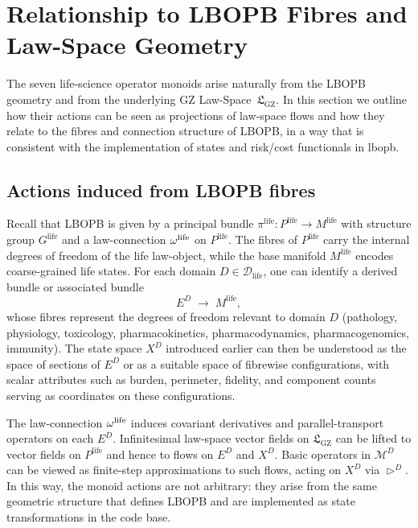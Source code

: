 \documentclass[11pt]{book}
\theoremstyle{plain}
\theoremstyle{definition}
\theoremstyle{remark}
\newcommand{\GZLS}{\ensuremath{\mathfrak{L}_{\mathrm{GZ}}}}       \newcommand{\GZLT}{\ensuremath{M_{!w}}}                           \newcommand{\GZLOC}{\ensuremath{A_M}}                             \newcommand{\GZLCurv}{\ensuremath{\mathcal{F}_{\mathrm{law}}}}
\begin{document}
\section{Relationship to LBOPB Fibres and Law-Space Geometry}


The seven life-science operator monoids arise naturally from the LBOPB
geometry and from the underlying GZ Law-Space~$\GZLS$. In this section
we outline how their actions can be seen as projections of law-space
flows and how they relate to the fibres and connection structure of
LBOPB, in a way that is consistent with the implementation of states
and risk/cost functionals in lbopb.

\subsection*{Actions induced from LBOPB fibres}

Recall that LBOPB is given by a principal bundle
$\pi^{\mathrm{life}} \colon P^{\mathrm{life}} \to M^{\mathrm{life}}$
with structure group $G^{\mathrm{life}}$ and a law-connection
$\omega^{\mathrm{life}}$ on $P^{\mathrm{life}}$. The fibres of
$P^{\mathrm{life}}$ carry the internal degrees of freedom of the life
law-object, while the base manifold $M^{\mathrm{life}}$ encodes
coarse-grained life states. For each domain $D \in \mathcal{D}_{\mathrm{life}}$,
one can identify a derived bundle or associated bundle
\[
  E^{D} \;\to\; M^{\mathrm{life}},
\]
whose fibres represent the degrees of freedom relevant to domain $D$
(pathology, physiology, toxicology, pharmacokinetics, pharmacodynamics,
pharmacogenomics, immunity). The state space $X^{D}$ introduced earlier
can then be understood as the space of sections of $E^{D}$ or as a
suitable space of fibrewise configurations, with scalar attributes such
as burden, perimeter, fidelity, and component counts serving as
coordinates on these configurations.

The law-connection $\omega^{\mathrm{life}}$ induces covariant derivatives
and parallel-transport operators on each $E^{D}$. Infinitesimal
law-space vector fields on $\GZLS$ can be lifted to vector fields on
$P^{\mathrm{life}}$ and hence to flows on $E^{D}$ and $X^{D}$. Basic
operators in $\mathcal{M}^{D}$ can be viewed as finite-step
approximations to such flows, acting on $X^{D}$ via
$\triangleright^{D}$. In this way, the monoid actions are not arbitrary:
they arise from the same geometric structure that defines LBOPB and are
implemented as state transformations in the code base.
\end{document}
